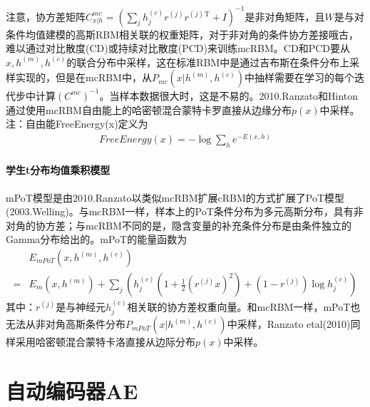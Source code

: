         注意，协方差矩阵$C_{x|h}^{mc} = (\sum_j h_j^{(c)}r^{(j)} r^{(j)}{}^\mathrm{T}+I)^{-1}$是非对角矩阵，且$W$是与对条件均值建模的高斯RBM相关联的权重矩阵，对于非对角的条件协方差接哦古，难以通过对比散度(CD)或持续对比散度(PCD)来训练mcRBM。CD和PCD要从$x,h^{(m)},h^{(c)}$的联合分布中采样，这在标准RBM中是通过吉布斯在条件分布上采样实现的，但是在mcRBM中，从$P_{mc}(x|h^{(m)},h^{(c)})$中抽样需要在学习的每个迭代步中计算$(C^{mc})^{-1}$。当样本数据很大时，这是不易的。2010.Ranzato和Hinton通过使用mcRBM自由能上的哈密顿混合蒙特卡罗直接从边缘分布$p(x)$中采样。\\
        注：自由能FreeEnergy(x)定义为
        \begin{align*}
        FreeEnergy(x) = -\log \sum_h e^{-E(x,h)}
        \end{align*}

        \paragraph{学生t分布均值乘积模型}mPoT模型是由2010.Ranzato以类似mcRBM扩展cRBM的方式扩展了PoT模型(2003.Welling)。与mcRBM一样，样本上的PoT条件分布为多元高斯分布，具有非对角的协方差；与mcRBM不同的是，隐含变量的补充条件分布是由条件独立的Gamma分布给出的。mPoT的能量函数为
        \begin{align*}
        &E_{mPoT} \left( x,h^{(m)},h^{(c)} \right) \\
        ={}& E_m \left( x,h^{(m)} \right) + \sum_j \left( h_j^{(c)}\left( 1+\frac{1}{2}\left( r^{(j)}x \right)^2  \right)+ \left( 1-r^{(j)} \right) \log h_j^{(c)}   \right)
        \end{align*}
        其中：$r^{(j)}$是与神经元$h_j^{(c)}$相关联的协方差权重向量。和mcRBM一样，mPoT也无法从非对角高斯条件分布$P_{mPoT}(x|h^{(m)},h^{(c)})$中采样，Ranzato etal(2010)同样采用哈密顿混合蒙特卡洛直接从边际分布$p(x)$中采样。

\section{自动编码器AE}
